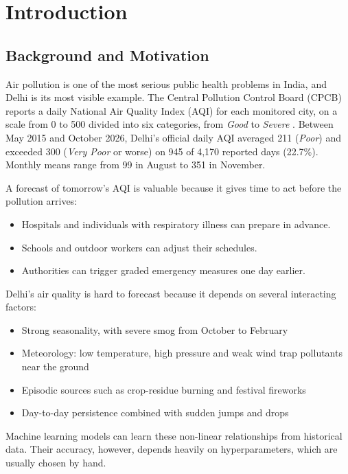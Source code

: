 \section{Introduction}

\subsection{Background and Motivation}
Air pollution is one of the most serious public health problems in India, and Delhi is its most visible example. The Central Pollution Control Board (CPCB) reports a daily National Air Quality Index (AQI) for each monitored city, on a scale from 0 to 500 divided into six categories, from \emph{Good} to \emph{Severe} \cite{cpcb2014}. Between May 2015 and October 2026, Delhi's official daily AQI averaged 211 (\emph{Poor}) and exceeded 300 (\emph{Very Poor} or worse) on 945 of 4,170 reported days (22.7\%). Monthly means range from 99 in August to 351 in November.

A forecast of tomorrow's AQI is valuable because it gives time to act before the pollution arrives:
\begin{itemize}
\item Hospitals and individuals with respiratory illness can prepare in advance.
\item Schools and outdoor workers can adjust their schedules.
\item Authorities can trigger graded emergency measures one day earlier.
\end{itemize}

Delhi's air quality is hard to forecast because it depends on several interacting factors:
\begin{itemize}
\item Strong seasonality, with severe smog from October to February
\item Meteorology: low temperature, high pressure and weak wind trap pollutants near the ground \cite{guttikunda2012}
\item Episodic sources such as crop-residue burning and festival fireworks
\item Day-to-day persistence combined with sudden jumps and drops
\end{itemize}

Machine learning models can learn these non-linear relationships from historical data. Their accuracy, however, depends heavily on hyperparameters, which are usually chosen by hand.

